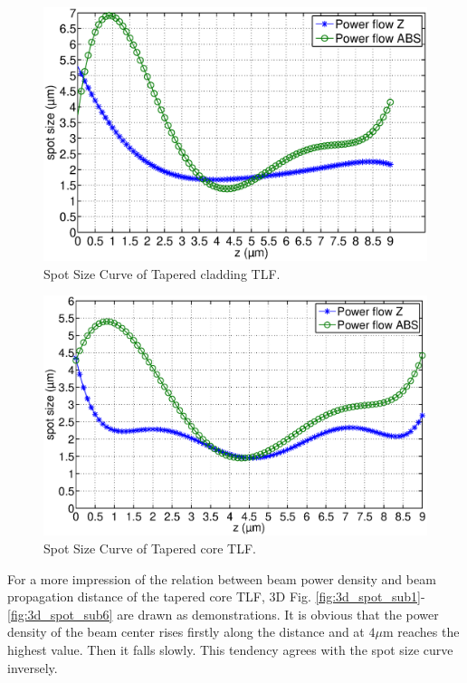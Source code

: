 \begin{figure}[!ht]
		\centering
		\includegraphics[width=0.7 \textwidth]{bilder/Tapered_cladding_spot_curve}
		\caption{Spot Size Curve of Tapered cladding TLF.}
		\label{fig:Tapered_cladding_spot_curve}
\end{figure} 
\begin{figure}[!ht]
		\centering
		\includegraphics[width=0.7 \textwidth]{bilder/Tapered_core_spot_curve}
		\caption{Spot Size Curve of Tapered core TLF.}
 		\label{fig:Tapered_core_spot_curve}	
\end{figure}
For a more impression of the relation between beam power density and beam propagation distance of the tapered core TLF, 3D Fig. \ref{fig:3d_spot_sub1}-\ref{fig:3d_spot_sub6} are drawn as demonstrations. It is obvious that the power density of the beam center rises firstly along the distance and at $4\mu$m reaches the highest value. Then it falls slowly. This tendency agrees with the spot size curve inversely. \\

